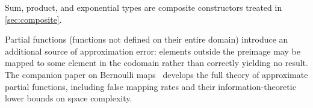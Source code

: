 \documentclass[ ../main.tex]{subfiles}
\begin{document}
Sum, product, and exponential types are composite constructors treated in \cref{sec:composite}.

\begin{remark}
Partial functions (functions not defined on their entire domain) introduce an additional source of approximation error: elements outside the preimage may be mapped to some element in the codomain rather than correctly yielding no result.
The companion paper on Bernoulli maps~\cite{bernoulliMaps} develops the full theory of approximate partial functions, including false mapping rates and their information-theoretic lower bounds on space complexity.
\end{remark}
\end{document}
